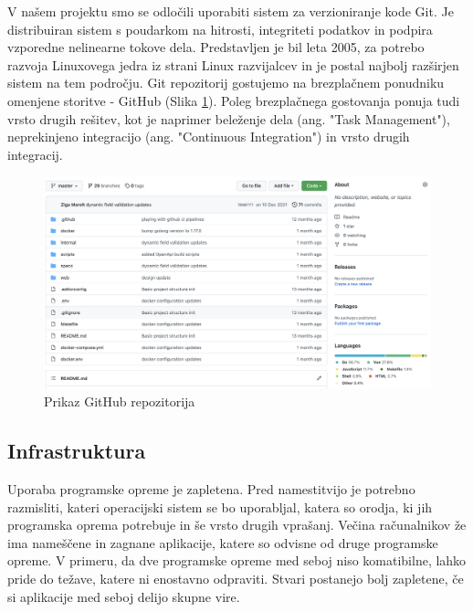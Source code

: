 \documentclass[a4paper, 12pt]{book}
\begin{document}
V našem projektu smo se odločili uporabiti sistem za verzioniranje kode Git. Je distribuiran sistem s poudarkom na hitrosti, integriteti podatkov in podpira vzporedne nelinearne tokove dela. Predstavljen je bil leta 2005, za potrebo razvoja Linuxovega jedra iz strani Linux razvijalcev \cite{git-history} in je postal najbolj razširjen sistem na tem področju. Git repozitorij gostujemo na brezplačnem ponudniku omenjene storitve - GitHub (Slika \ref{github-project}). Poleg brezplačnega gostovanja ponuja tudi vrsto drugih rešitev, kot je naprimer beleženje dela (ang. "Task Management"), neprekinjeno integracijo (ang. "Continuous Integration") in vrsto drugih integracij.

\begin{figure}[h]
\begin{center}
\includegraphics[width=1\textwidth]{slike/github.png}
\end{center}
\caption{ Prikaz GitHub repozitorija }
\label{github-project}
\end{figure}

\subsection{Infrastruktura}
Uporaba programske opreme je zapletena. Pred namestitvijo je potrebno razmisliti, kateri operacijski sistem se bo uporabljal, katera so orodja, ki jih programska oprema potrebuje in še vrsto drugih vprašanj. Večina računalnikov že ima nameščene in zagnane aplikacije, katere so odvisne od druge programske opreme. V primeru, da dve programske opreme med seboj niso komatibilne, lahko pride do težave, katere ni enostavno odpraviti. Stvari postanejo bolj zapletene, če si aplikacije med seboj delijo skupne vire. 
\end{document}
